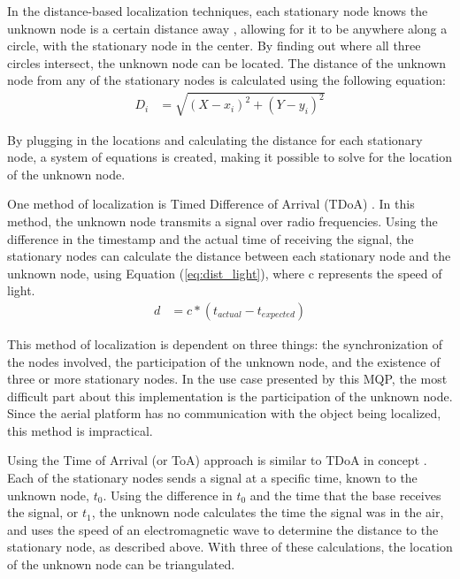 In the distance-based localization techniques, each stationary node knows the unknown node is a certain distance away \cite{local_conf}, allowing for it to be anywhere along a circle, with the stationary node in the center. By finding out where all three circles intersect, the unknown node can be located. The distance of the unknown node from any of the stationary nodes is calculated using the following equation: 
\begin{align}\label{eq:dist_coord}
D_i &=\sqrt{(X - x_i)^2 + (Y-y_i)^2}
\end{align}\par
By plugging in the locations and calculating the distance for each stationary node, a system of equations is created, making it possible to solve for the location of the unknown node.\par
One method of localization is Timed Difference of Arrival (TDoA) \cite{local_conf}. In this method, the unknown node transmits a signal over radio frequencies. Using the difference in the timestamp and the actual time of receiving the signal, the stationary nodes can calculate the distance between each stationary node and the unknown node, using Equation (\ref{eq:dist_light}), where c represents the speed of light.
\begin{align}\label{eq:dist_light} 
    d &= c*(t_{actual} - t_{expected}) 
\end{align} \par
This method of localization is dependent on three things: the synchronization of the nodes involved, the participation of the unknown node, and the existence of three or more stationary nodes. In the use case presented by this MQP, the most difficult part about this implementation is the participation of the unknown node. Since the aerial platform has no communication with the object being localized, this method is impractical. \par

Using the Time of Arrival (or ToA) approach is similar to TDoA in concept \cite{local_conf}. Each of the stationary nodes sends a signal at a specific time, known to the unknown node, $t_0$. Using the difference in $t_0$ and the time that the base receives the signal, or $t_1$, the unknown node calculates the time the signal was in the air, and uses the speed of an electromagnetic wave to determine the distance to the stationary node, as described above. With three of these calculations, the location of the unknown node can be triangulated.\par

